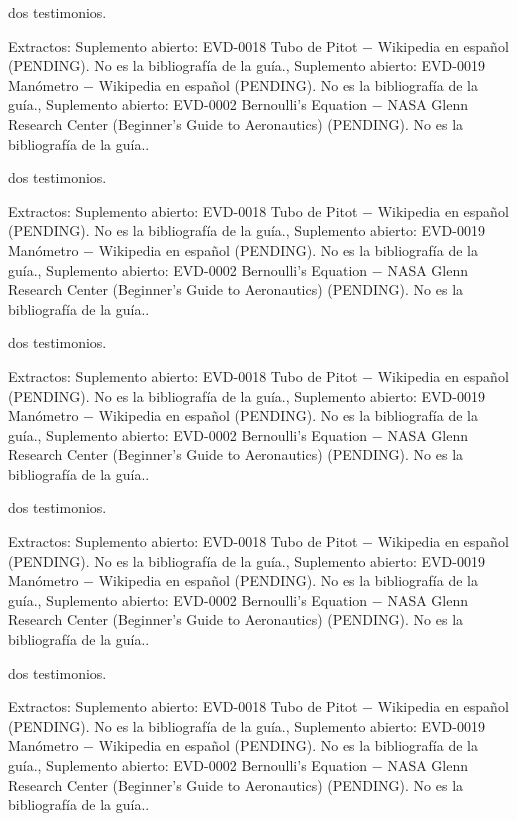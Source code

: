 \documentclass{book}
\begin{document}
\noindent dos testimonios.

\noindent Extractos: Suplemento abierto: EVD-0018 Tubo de Pitot \(-\) Wikipedia en español (PENDING). No es la bibliografía de la guía., Suplemento abierto: EVD-0019 Manómetro \(-\) Wikipedia en español (PENDING). No es la bibliografía de la guía., Suplemento abierto: EVD-0002 Bernoulli's Equation \(-\) NASA Glenn Research Center (Beginner's Guide to Aeronautics) (PENDING). No es la bibliografía de la guía..

\noindent dos testimonios.

\noindent Extractos: Suplemento abierto: EVD-0018 Tubo de Pitot \(-\) Wikipedia en español (PENDING). No es la bibliografía de la guía., Suplemento abierto: EVD-0019 Manómetro \(-\) Wikipedia en español (PENDING). No es la bibliografía de la guía., Suplemento abierto: EVD-0002 Bernoulli's Equation \(-\) NASA Glenn Research Center (Beginner's Guide to Aeronautics) (PENDING). No es la bibliografía de la guía..

\noindent dos testimonios.

\noindent Extractos: Suplemento abierto: EVD-0018 Tubo de Pitot \(-\) Wikipedia en español (PENDING). No es la bibliografía de la guía., Suplemento abierto: EVD-0019 Manómetro \(-\) Wikipedia en español (PENDING). No es la bibliografía de la guía., Suplemento abierto: EVD-0002 Bernoulli's Equation \(-\) NASA Glenn Research Center (Beginner's Guide to Aeronautics) (PENDING). No es la bibliografía de la guía..

\noindent dos testimonios.

\noindent Extractos: Suplemento abierto: EVD-0018 Tubo de Pitot \(-\) Wikipedia en español (PENDING). No es la bibliografía de la guía., Suplemento abierto: EVD-0019 Manómetro \(-\) Wikipedia en español (PENDING). No es la bibliografía de la guía., Suplemento abierto: EVD-0002 Bernoulli's Equation \(-\) NASA Glenn Research Center (Beginner's Guide to Aeronautics) (PENDING). No es la bibliografía de la guía..

\noindent dos testimonios.

\noindent Extractos: Suplemento abierto: EVD-0018 Tubo de Pitot \(-\) Wikipedia en español (PENDING). No es la bibliografía de la guía., Suplemento abierto: EVD-0019 Manómetro \(-\) Wikipedia en español (PENDING). No es la bibliografía de la guía., Suplemento abierto: EVD-0002 Bernoulli's Equation \(-\) NASA Glenn Research Center (Beginner's Guide to Aeronautics) (PENDING). No es la bibliografía de la guía..
\end{document}
